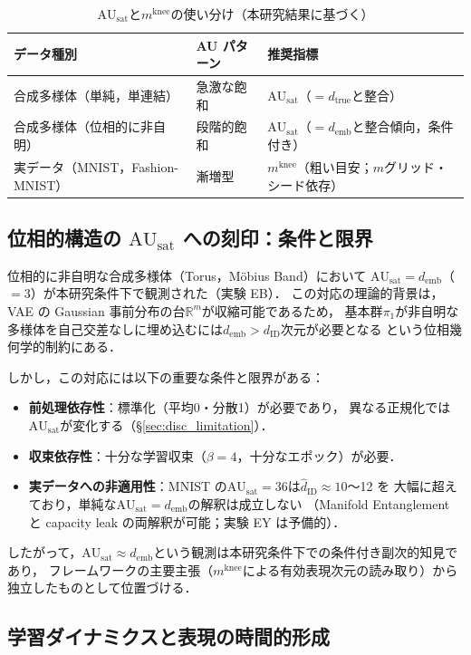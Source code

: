 \documentclass[11pt,a4paper]{jsarticle}
\newcommand{\dID}{d_{\mathrm{ID}}}
\newcommand{\dtrue}{d_{\mathrm{true}}}
\newcommand{\R}{\mathbb{R}}
\newcommand{\AUsat}{\mathrm{AU}_{\mathrm{sat}}}
\newcommand{\mknee}{m^{\mathrm{knee}}}
\newcommand{\demb}{d_{\mathrm{emb}}}
\begin{document}
\begin{table}[H]
\centering
\caption{$\AUsat$と$\mknee$の使い分け（本研究結果に基づく）}
\label{tab:au_comparison}
\small
\begin{tabular}{lll}
\toprule
データ種別 & AU パターン & 推奨指標 \\
\midrule
合成多様体（単純，単連結） & 急激な飽和 & $\AUsat$（$= \dtrue$と整合） \\
合成多様体（位相的に非自明） & 段階的飽和 & $\AUsat$（$= \demb$と整合傾向，条件付き） \\
実データ（MNIST，Fashion-MNIST） & 漸増型 & $\mknee$（粗い目安；$m$グリッド・シード依存） \\
\bottomrule
\end{tabular}
\end{table}

\subsection{位相的構造の $\AUsat$ への刻印：条件と限界}\label{sec:disc_topology}

位相的に非自明な合成多様体（Torus，Möbius Band）において
$\AUsat = \demb$（$= 3$）が本研究条件下で観測された（実験 EB）．
この対応の理論的背景は，VAE の Gaussian 事前分布の台$\R^m$が収縮可能であるため，
基本群$\pi_1$が非自明な多様体を自己交差なしに埋め込むには$\demb > \dID$次元が必要となる
という位相幾何学的制約\cite{hatcher2002algebraic,guillemin1974differential}にある．

しかし，この対応には以下の重要な条件と限界がある：
\begin{itemize}
  \item \textbf{前処理依存性}：標準化（平均0・分散1）が必要であり，
        異なる正規化では$\AUsat$が変化する（§\ref{sec:disc_limitation}）．
  \item \textbf{収束依存性}：十分な学習収束（$\beta = 4$，十分なエポック）が必要．
  \item \textbf{実データへの非適用性}：MNIST の$\AUsat = 36$は$\hat{d}_\mathrm{ID} \approx 10$〜12 を
        大幅に超えており，単純な$\AUsat = \demb$の解釈は成立しない
        （Manifold Entanglement と capacity leak の両解釈が可能；実験 EY は予備的）．
\end{itemize}

したがって，$\AUsat \approx \demb$という観測は本研究条件下での条件付き副次的知見であり，
フレームワークの主要主張（$\mknee$による有効表現次元の読み取り）から独立したものとして位置づける．

\subsection{学習ダイナミクスと表現の時間的形成}\label{sec:disc_dynamics}
\end{document}
